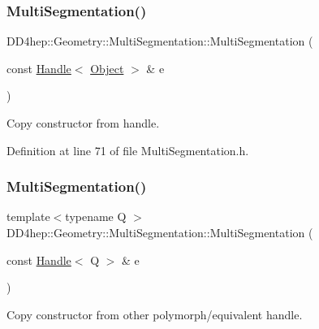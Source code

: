 \subsubsection{\texorpdfstring{Multi\+Segmentation()}{MultiSegmentation()}\hspace{0.1cm}{\footnotesize\ttfamily [4/5]}}
{\footnotesize\ttfamily D\+D4hep\+::\+Geometry\+::\+Multi\+Segmentation\+::\+Multi\+Segmentation (\begin{DoxyParamCaption}\item[{const \hyperlink{class_d_d4hep_1_1_handle}{Handle}$<$ \hyperlink{class_d_d4hep_1_1_geometry_1_1_multi_segmentation_ab30207d7b5e4366c7227de5743a88452}{Object} $>$ \&}]{e }\end{DoxyParamCaption})\hspace{0.3cm}{\ttfamily [inline]}}



Copy constructor from handle. 



Definition at line 71 of file Multi\+Segmentation.\+h.

\hypertarget{class_d_d4hep_1_1_geometry_1_1_multi_segmentation_a708cf7024e574b5d91cba0db3737f6b3}{}\label{class_d_d4hep_1_1_geometry_1_1_multi_segmentation_a708cf7024e574b5d91cba0db3737f6b3} 
\subsubsection{\texorpdfstring{Multi\+Segmentation()}{MultiSegmentation()}\hspace{0.1cm}{\footnotesize\ttfamily [5/5]}}
{\footnotesize\ttfamily template$<$typename Q $>$ \\
D\+D4hep\+::\+Geometry\+::\+Multi\+Segmentation\+::\+Multi\+Segmentation (\begin{DoxyParamCaption}\item[{const \hyperlink{class_d_d4hep_1_1_handle}{Handle}$<$ Q $>$ \&}]{e }\end{DoxyParamCaption})\hspace{0.3cm}{\ttfamily [inline]}}



Copy constructor from other polymorph/equivalent handle. 



